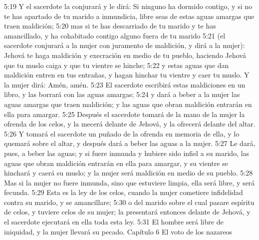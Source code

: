 5:19 Y el sacerdote la conjurará y le dirá: Si ninguno ha dormido contigo, y si no te has apartado de tu marido a inmundicia, libre seas de estas aguas amargas que traen maldición;  
5:20 mas si te has descarriado de tu marido y te has amancillado, y ha cohabitado contigo alguno fuera de tu marido  
5:21 (el sacerdote conjurará a la mujer con juramento de maldición, y dirá a la mujer): Jehová te haga maldición y execración en medio de tu pueblo, haciendo Jehová que tu muslo caiga y que tu vientre se hinche;  
5:22 y estas aguas que dan maldición entren en tus entrañas, y hagan hinchar tu vientre y caer tu muslo. Y la mujer dirá: Amén, amén.  
5:23 El sacerdote escribirá estas maldiciones en un libro, y las borrará con las aguas amargas;  
5:24 y dará a beber a la mujer las aguas amargas que traen maldición; y las aguas que obran maldición entrarán en ella para amargar.  
5:25 Después el sacerdote tomará de la mano de la mujer la ofrenda de los celos, y la mecerá delante de Jehová, y la ofrecerá delante del altar.  
5:26 Y tomará el sacerdote un puñado de la ofrenda en memoria de ella, y lo quemará sobre el altar, y después dará a beber las aguas a la mujer.  
5:27 Le dará, pues, a beber las aguas; y si fuere inmunda y hubiere sido infiel a su marido, las aguas que obran maldición entrarán en ella para amargar, y su vientre se hinchará y caerá su muslo; y la mujer será maldición en medio de su pueblo.  
5:28 Mas si la mujer no fuere inmunda, sino que estuviere limpia, ella será libre, y será fecunda.  
5:29 Esta es la ley de los celos, cuando la mujer cometiere infidelidad contra su marido, y se amancillare;  
5:30 o del marido sobre el cual pasare espíritu de celos, y tuviere celos de su mujer; la presentará entonces delante de Jehová, y el sacerdote ejecutará en ella toda esta ley.  
5:31 El hombre será libre de iniquidad, y la mujer llevará su pecado.  
Capítulo 6
El voto de los nazareos  

